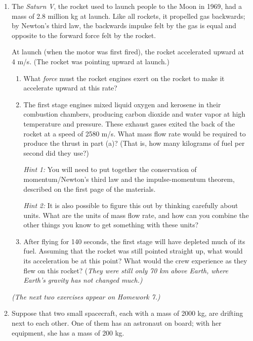 \documentclass[12pt]{article}
\begin{document}
\begin{enumerate}

	\item The {\it Saturn V}, the rocket used to launch people to the Moon in 1969, had a mass of 2.8 million kg at launch. Like all rockets, it propelled gas backwards; by Newton's third law, the backwards impulse felt by the gas is equal and opposite to the forward force felt by the rocket.

		At launch (when the motor was first fired), the rocket accelerated upward at 4 m/s. (The rocket was pointing upward at launch.)

		\begin{enumerate}
			\item What {\it force} must the rocket engines exert on the rocket to make it accelerate upward at this rate?
			\item {The first stage engines mixed liquid oxygen and kerosene in their combustion chambers, producing carbon dioxide and water vapor at high temperature and pressure. These exhaust gases exited the back
				of the rocket at a speed of 2580 m/s. What mass flow rate would be required to produce the thrust in part (a)? (That is, how many kilograms of fuel per second did they use?)

				{\it Hint 1:} You will need to put together the conservation of momentum/Newton's third law and the impulse-momentum theorem, described on the first page of the materials.

				{\it Hint 2:} It is also possible to figure this out by thinking carefully about units. What are the units of mass flow rate, and how can you combine the other things you know to get something with these units?

				}
			\item After flying for 140 seconds, the first stage will have depleted much of its fuel. Assuming that the rocket was still pointed straight up, what would its acceleration be at this point? What would the crew experience as they flew on this rocket? {(\it They were still only 70 km above Earth, where Earth's gravity has not changed much.)}
		\end{enumerate}


		{\it (The next two exercises appear on Homework 7.)}

\item Suppose that two small spacecraft, each with a mass of 2000 kg, are drifting next to each other. One of them has an astronaut on board; with her equipment, she has a mass of 200 kg. 


\end{enumerate}
\end{document}
